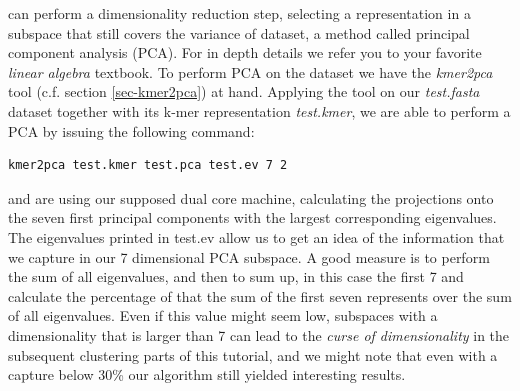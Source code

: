 can perform a dimensionality reduction step, selecting a representation in
a subspace that still covers the variance of dataset, a method called
principal component analysis (PCA). For in depth details we refer you
to your favorite \emph{linear algebra} textbook. To perform
PCA on the dataset we have the \emph{kmer2pca} tool (c.f. section
\ref{sec-kmer2pca}) at hand. Applying the tool on our 
\emph{test.fasta} dataset together with its k-mer representation
\emph{test.kmer}, we are able to perform a PCA by issuing the
following command:
\begin{lstlisting}
kmer2pca test.kmer test.pca test.ev 7 2
\end{lstlisting}
and are using our supposed dual core machine, calculating the
projections onto the seven first principal components with the largest
corresponding eigenvalues. The eigenvalues printed in test.ev allow us
to get an idea of the information that we capture in
our 7 dimensional PCA subspace. A good measure is to perform the sum
of all eigenvalues, and then to sum up, in this case the first 7 and
calculate the percentage of that the sum of the first seven represents
over the sum of all eigenvalues. Even if this value might seem low,
subspaces with a dimensionality that is larger than 7 can lead to the
\emph{curse of dimensionality} in the subsequent clustering parts of this
tutorial, and we might note that even with a capture below 30\% our
algorithm still yielded interesting results.

